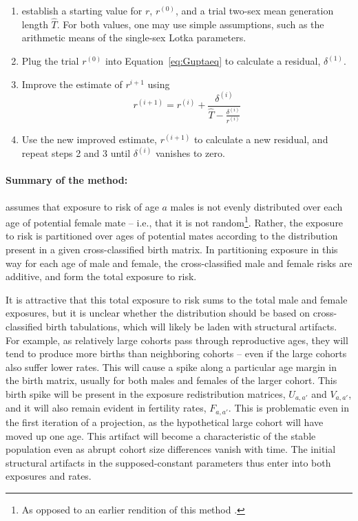 \begin{enumerate}
  \item establish a starting value for $r$,
$r^{(0)}$, and a trial two-sex mean generation length
$\widehat{T}$. For both values, one may use simple
assumptions, such as the arithmetic means of the single-sex Lotka parameters.
  \item Plug the trial $r^{(0)}$ into Equation~\eqref{eq:Guptaeq}
  to calculate a residual, $\delta ^{(1)}$.
  \item Improve the estimate of $r^{i+1}$ using
  \begin{equation}
  r^{(i+1)} = r^{(i)} + \frac{\delta^{(i)}}{\widehat{T} -
\frac{\delta ^{(i)}}{r^{(i)} }}
  \end{equation}
  \item Use the new improved estimate, $r^{(i+1)}$ to calculate a new residual,
  and repeat steps 2 and 3 until $\delta^{(i)}$ vanishes to zero.
\end{enumerate}

\paragraph{Summary of the method: } \citet{gupta1978alternative} assumes that exposure to risk of
 age $a$ males is not evenly distributed over each age of potential female
 mate -- i.e., that it is not random\footnote{As opposed to an earlier rendition
 of this method \citep{gupta1972two}.}. Rather, the exposure to risk is
 partitioned over ages of potential mates according to the distribution present in a given 
 cross-classified birth matrix. In partitioning exposure in this way for each
 age of male and female, the cross-classified male and female risks are additive, and
 form the total exposure to risk. 
 
 It is attractive that this total exposure to
 risk sums to the total male and female exposures, but it is unclear whether the
 distribution should be based on cross-classified birth tabulations, which will
 likely be laden with structural artifacts. For example, as relatively large
 cohorts pass through reproductive ages, they will tend to produce more births
 than neighboring cohorts -- even if the large cohorts also suffer lower rates.
 This will cause a spike along a particular age margin in the birth matrix,
 usually for both males and females of the larger cohort. This birth spike will
 be present in the exposure redistribution matrices, $U_{a,a'}$ and
 $V_{a,a'}$, and it will also remain evident in fertility rates, $F_{a,a'}$.
 This is problematic even in the first iteration of a projection, as the
 hypothetical large cohort will have moved up one age. This artifact will
become a characteristic of the stable population even as abrupt cohort size
differences vanish with time. The initial structural artifacts in the 
supposed-constant parameters thus enter into both exposures and rates. 

